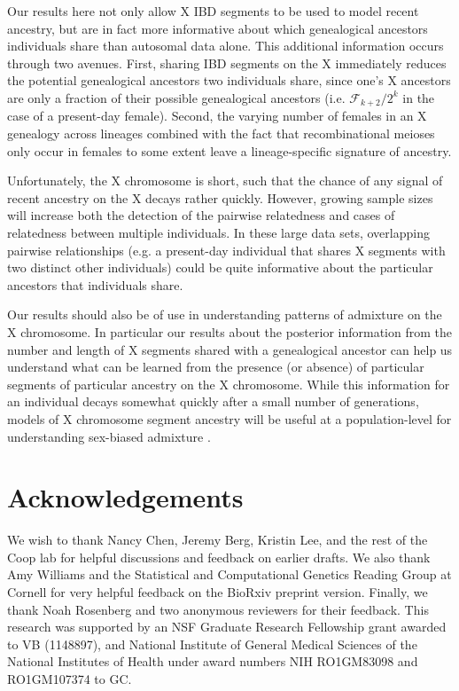 \documentclass[11pt]{article}
\begin{document}
Our results here not only allow X IBD segments to be used to model recent
ancestry, but are in fact more informative about which genealogical ancestors
individuals share than autosomal data alone. This additional information occurs
through two avenues. First, sharing IBD segments on the X immediately reduces
the potential genealogical ancestors two individuals share, since one's X
ancestors are only a fraction of their possible genealogical ancestors (i.e.
$\mathcal{F}_{k+2}/2^{k}$ in the case of a present-day female). Second, the
varying number of females in an X genealogy across lineages combined with the
fact that recombinational meioses only occur in females to some extent leave a
lineage-specific signature of ancestry.

Unfortunately, the X chromosome is short, such that the chance of any signal of
recent ancestry on the X decays rather quickly. However, growing sample sizes
will increase both the detection of the pairwise relatedness and cases of
relatedness between multiple individuals. In these large data sets, overlapping
pairwise relationships (e.g. a present-day individual that shares X segments
with two distinct other individuals) could be quite informative about the
particular ancestors that individuals share. 

Our results should also be of use in understanding patterns of admixture on the
X chromosome. In particular our results about the posterior information from
the number and length of X segments shared with a genealogical ancestor can
help us understand what can be learned from the presence (or absence) of
particular segments of particular ancestry on the X chromosome. While this
information for an individual decays somewhat quickly after a small number of
generations, models of X chromosome segment ancestry will be useful at a
population-level for understanding sex-biased admixture
\citep{bryc2010genome,Goldberg:2015ja,Shringarpure039347}.

\section{Acknowledgements}

We wish to thank Nancy Chen, Jeremy Berg, Kristin Lee, and the rest of the Coop
lab for helpful discussions and feedback on earlier drafts. We also thank Amy
Williams and the Statistical and Computational Genetics Reading Group at
Cornell for very helpful feedback on the BioRxiv preprint version. Finally, we
thank Noah Rosenberg and two anonymous reviewers for their feedback.
%
This research was supported by an NSF Graduate Research Fellowship grant
awarded to VB (1148897), and National Institute of General Medical
Sciences of the National Institutes of Health under award numbers NIH
RO1GM83098 and RO1GM107374 to GC.
\end{document}
